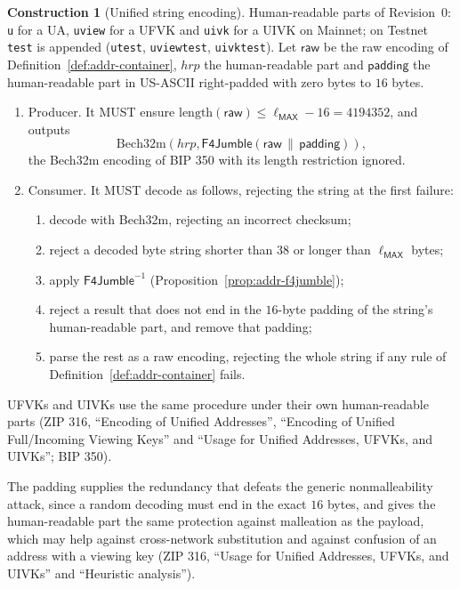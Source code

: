 \documentclass[11pt,a4paper]{article}
\theoremstyle{definition}
\newtheorem{construction}[theorem]{Construction}
\begin{document}
\begin{construction}[Unified string encoding]\label{def:addr-string}
Human-readable parts of Revision~$0$: \texttt{u} for a UA, \texttt{uview}
for a UFVK and \texttt{uivk} for a UIVK on Mainnet; on Testnet
\texttt{test} is appended (\texttt{utest}, \texttt{uviewtest},
\texttt{uivktest}). Let $\mathsf{raw}$ be the raw encoding of
Definition~\ref{def:addr-container}, $\mathit{hrp}$ the human-readable part
and $\mathsf{padding}$ the human-readable part in US-ASCII right-padded
with zero bytes to $16$ bytes.
\begin{enumerate}
\item Producer. It MUST ensure $\mathrm{length}(\mathsf{raw}) \le
  \ell_{\mathsf{MAX}} - 16 = 4194352$, and outputs
  \[
    \mathrm{Bech32m}(\mathit{hrp}, \mathsf{F4Jumble}(\mathsf{raw} \,\|\,
    \mathsf{padding})),
  \]
  the Bech32m encoding of BIP 350 with its length restriction ignored.
\item Consumer. It MUST decode as follows, rejecting the string at the
  first failure:
  \begin{enumerate}[label=(\arabic*)]
  \item decode with Bech32m, rejecting an incorrect checksum;
  \item reject a decoded byte string shorter than $38$ or longer than
    $\ell_{\mathsf{MAX}}$ bytes;
  \item apply $\mathsf{F4Jumble}^{-1}$
    (Proposition~\ref{prop:addr-f4jumble});
  \item reject a result that does not end in the $16$-byte padding of the
    string's human-readable part, and remove that padding;
  \item parse the rest as a raw encoding, rejecting the whole string if
    any rule of Definition~\ref{def:addr-container} fails.
  \end{enumerate}
\end{enumerate}
UFVKs and UIVKs use the same procedure under their own human-readable parts
(ZIP 316, ``Encoding of Unified Addresses'', ``Encoding of Unified
Full/Incoming Viewing Keys'' and ``Usage for Unified Addresses, UFVKs, and
UIVKs''; BIP 350).
\end{construction}

The padding supplies the redundancy that defeats the generic
nonmalleability attack, since a random decoding must end in the exact
$16$ bytes, and gives the human-readable part the same protection against
malleation as the payload, which may help against cross-network
substitution and against confusion of an address with a viewing key (ZIP 316,
``Usage for Unified Addresses, UFVKs, and UIVKs'' and ``Heuristic analysis'').
\end{document}
